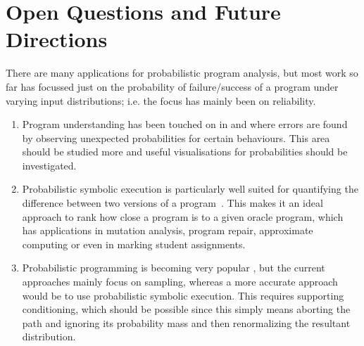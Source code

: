 \section{Open Questions and Future Directions}
\label{sec:future}

There are many applications for probabilistic program analysis, but most work so far has focussed just on the probability of failure/success of a program under varying input distributions; i.e. the focus has mainly been on reliability.

\begin{enumerate}
\item Program understanding has been touched on in \cite{Geldenhuys2012} and \cite{Filieri2015} where errors are found by observing unexpected probabilities for certain behaviours. This area should be studied more and useful visualisations for probabilities should be investigated.


\item Probabilistic symbolic execution is particularly well suited for quantifying the difference between two versions of a program~\cite{Filieri2015b}. This makes it an ideal approach to rank how close a program is to a given oracle program, which has applications in mutation analysis, program repair, approximate computing or even in marking student assignments.

\item Probabilistic programming is becoming very popular \cite{Gordon2014}, but the current approaches mainly focus on sampling, whereas a more accurate approach would be to use probabilistic symbolic execution.  This requires supporting conditioning, which should be possible since this simply means aborting the path and ignoring its probability mass and then renormalizing the resultant distribution.


\end{enumerate}
